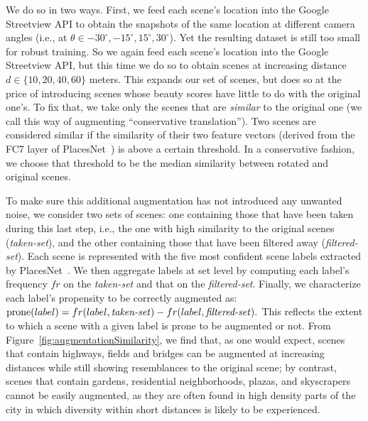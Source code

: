 We do so in two ways. First, we feed each scene's location into the Google Streetview API to obtain  the snapshots of the same location at different camera angles (i.e., at $\theta \in {-30^{\circ}, -15^{\circ} , 15^{\circ} , 30^{\circ} }$). Yet the resulting dataset is still too small for robust training. So we again feed each scene's location into the Google Streetview API, but this time we do so to obtain scenes at  increasing distance $d \in \{10,20,40,60\}$ meters.  This expands our set of scenes, but  does so at the price of introducing scenes whose beauty scores have little to do with the original one's. To fix that, we take only the scenes that are \emph{similar} to the original one (we call this way of augmenting ``conservative translation'').  Two scenes are considered similar if the similarity of their two feature vectors (derived from the FC7 layer of PlacesNet~\cite{zhou2014learning}) is above a certain threshold. In a conservative fashion, we choose that threshold to be the median similarity between rotated and original scenes.


To make sure this additional augmentation has not introduced any unwanted noise, we consider  two sets of scenes: one containing those that have been taken during this last step, i.e., the one with high similarity to the original scenes (\emph{taken-set}), and the other containing those that have been filtered away (\emph{filtered-set}). Each scene is represented with the five most confident scene labels extracted by PlacesNet~\cite{zhou2014learning}. We then aggregate labels at set level by computing each label's frequency $fr$ on the \emph{taken-set} %
and that on the \emph{filtered-set}. Finally, we characterize each label's propensity to be correctly augmented as: 
$ \textrm{prone}(label)= fr(label,\textrm{\emph{taken-set}}) - fr(label,\textrm{\emph{filtered-set}}).$
This reflects the extent to which a scene with a given label is prone to be augmented or not. From Figure~\ref{fig:augmentationSimilarity}, we find that, as one would expect, scenes that contain highways, fields and bridges can be augmented at increasing distances while still showing resemblances to the original scene; by contrast, scenes that contain gardens, residential neighborhoods, plazas, and skyscrapers cannot be easily augmented, as they are often found in high density parts of the city in which diversity within short distances is likely to be experienced. 

